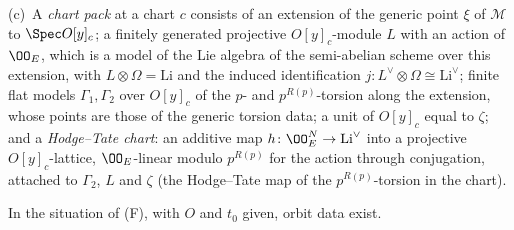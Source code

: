 \begin{definition}
(c)~A \emph{chart pack} at a chart $c$ consists of an extension of the generic point $\xi$ of $\mathcal M$ to
$\Spec O[y]_c$; a finitely generated projective $O[y]_c$-module $L$ with an action of $\OO_E$, which is a model of the Lie
algebra of the semi-abelian scheme over this extension, with $L\otimes\Omega=\mathrm{Li}$ and the induced identification
$j\colon L^\vee\otimes\Omega\cong\mathrm{Li}^\vee$; finite flat models $\Gamma_1,\Gamma_2$ over $O[y]_c$ of the $p$- and
$p^{R(p)}$-torsion along the extension, whose points are those of the generic torsion data; a unit of $O[y]_c$ equal to
$\zeta$; and a \emph{Hodge--Tate chart}: an additive map $h\colon\OO_E^N\to\mathrm{Li}^\vee$ into a projective
$O[y]_c$-lattice, $\OO_E$-linear modulo $p^{R(p)}$ for the action through conjugation, attached to $\Gamma_2$, $L$ and
$\zeta$ (the Hodge--Tate map of the $p^{R(p)}$-torsion in the chart).
\end{definition}

\begin{lemma}\label{pf:tower:orbit}
In the situation of (F), with $O$ and $t_0$ given, orbit data exist.
\end{lemma}


